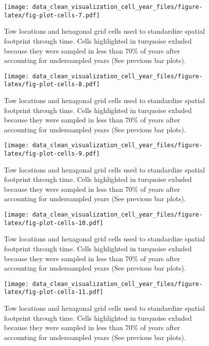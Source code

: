 \documentclass[
]{article}
\begin{document}
\begin{figure}
\centering
\texttt{[image: data\_clean\_visualization\_cell\_year\_files/figure-latex/fig-plot-cells-7.pdf]}
\caption{\label{fig:fig-plot-cells-7}Tow locations and hexagonal grid cells used to standardize spatial footprint through time. Cells highlighted in turquoise exluded because they were sampled in less than 70\% of years after accounting for undersampled years (See previous bar plots).}
\end{figure}

\begin{figure}
\centering
\texttt{[image: data\_clean\_visualization\_cell\_year\_files/figure-latex/fig-plot-cells-8.pdf]}
\caption{\label{fig:fig-plot-cells-8}Tow locations and hexagonal grid cells used to standardize spatial footprint through time. Cells highlighted in turquoise exluded because they were sampled in less than 70\% of years after accounting for undersampled years (See previous bar plots).}
\end{figure}

\begin{figure}
\centering
\texttt{[image: data\_clean\_visualization\_cell\_year\_files/figure-latex/fig-plot-cells-9.pdf]}
\caption{\label{fig:fig-plot-cells-9}Tow locations and hexagonal grid cells used to standardize spatial footprint through time. Cells highlighted in turquoise exluded because they were sampled in less than 70\% of years after accounting for undersampled years (See previous bar plots).}
\end{figure}

\begin{figure}
\centering
\texttt{[image: data\_clean\_visualization\_cell\_year\_files/figure-latex/fig-plot-cells-10.pdf]}
\caption{\label{fig:fig-plot-cells-10}Tow locations and hexagonal grid cells used to standardize spatial footprint through time. Cells highlighted in turquoise exluded because they were sampled in less than 70\% of years after accounting for undersampled years (See previous bar plots).}
\end{figure}

\begin{figure}
\centering
\texttt{[image: data\_clean\_visualization\_cell\_year\_files/figure-latex/fig-plot-cells-11.pdf]}
\caption{\label{fig:fig-plot-cells-11}Tow locations and hexagonal grid cells used to standardize spatial footprint through time. Cells highlighted in turquoise exluded because they were sampled in less than 70\% of years after accounting for undersampled years (See previous bar plots).}
\end{figure}
\end{document}
